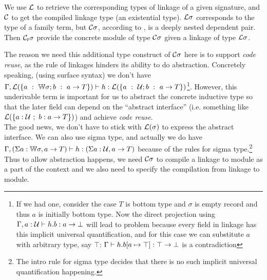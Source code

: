 We use ${\mathcal{L}}$ to retrieve the corresponding types of linkage of a given signature, and ${\mathcal{C}}$ to get the compiled linkage type (an existential type).
${\mathcal{L}}\sigma$ corresponds to the type of a family term, but ${\mathcal{C}}\sigma$, according to , is a deeply nested dependent pair. Then ${\mathcal{C}_t} \sigma$ provide the concrete module of type ${\mathcal{C}}\sigma$ given a linkage of type ${\mathcal{L}}\sigma$. 

The reason we need this additional type construct of ${\mathcal{C}}\sigma$ here is
to support \textit{code reuse}, as the rule of linkages hinders its
ability to do abstraction. Concretely speaking, (using surface syntax)
we don't have \\ ${ {\Gamma, {\mathcal{L}}(\{a~:~{\mathbb{W}} \sigma; b~:~a \to
T\})} \vdash {h} : {{\mathcal{L}}(\{a~:~{\mathcal{U}}; b~:~a \to T\})} }$\footnote{If we had one,
consider the case $T$ is bottom type and $\sigma$ is empty record and
thus $a$ is initially bottom type. Now the direct projection using
 ${ {\Gamma, a : {\mathcal{U}}} \vdash {h.b} : {a \to \bot} }$ will
lead to problem because every field in linkage has this implicit
universal quantification, and for this case we can substitute $a$ with
arbitrary type, say $\top$: ${ {\Gamma} \vdash {h.b[a \mapsto \top]} : {\top
\to \bot} }$ is a contradiction}.
However, this underivable term is important for us to abstract the
concrete inductive type so that the later field can depend on the
``abstract interface'' (i.e. something like ${\mathcal{L}}(\{a:{\mathcal{U}}~;~b:a \to T\})$) and achieve \textit{code reuse}. 
\\ The good news, we don't have to stick with ${\mathcal{L}}(\sigma)$ to express the abstract interface. We can also use sigma type, and actually 
we do have ${ {\Gamma, (\Sigma a : {\mathbb{W}}\sigma, a \to T)
} \vdash {h} : {(\Sigma a : {\mathcal{U}}, a \to T)} }$ because of the rules for sigma type.\footnote{The intro rule for sigma type decides that there is no such implicit universal quantification happening.}
Thus to allow abstraction happens, we need ${\mathcal{C}}\sigma$ to compile a
linkage to module as a part of the context and we also need
 to specify the compilation from linkage to
module.

